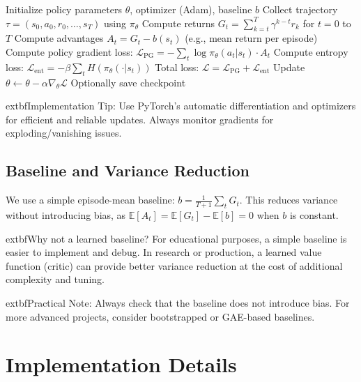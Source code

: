 \documentclass[conference]{IEEEtran}
\begin{document}
\begin{algorithm}[H]
\caption{REINFORCE with Entropy Regularization}
\label{alg:reinforce}
\begin{algorithmic}[1]
\State Initialize policy parameters $\theta$, optimizer (Adam), baseline $b$
    \State Collect trajectory $\tau = (s_0, a_0, r_0, \dots, s_T)$ using $\pi_\theta$
    \State Compute returns $G_t = \sum_{k=t}^T \gamma^{k-t} r_k$ for $t=0$ to $T$
    \State Compute advantages $A_t = G_t - b(s_t)$ (e.g., mean return per episode)
    \State Compute policy gradient loss: $\mathcal{L}_\text{PG} = -\sum_t \log \pi_\theta(a_t|s_t) \cdot A_t$
    \State Compute entropy loss: $\mathcal{L}_\text{ent} = -\beta \sum_t H(\pi_\theta(\cdot|s_t))$
    \State Total loss: $\mathcal{L} = \mathcal{L}_\text{PG} + \mathcal{L}_\text{ent}$
    \State Update $\theta \leftarrow \theta - \alpha \nabla_\theta \mathcal{L}$
    \State Optionally save checkpoint
\EndFor
\end{algorithmic}
\end{algorithm}

	extbf{Implementation Tip:} Use PyTorch's automatic differentiation and optimizers for efficient and reliable updates. Always monitor gradients for exploding/vanishing issues.

\subsection{Baseline and Variance Reduction}


We use a simple episode-mean baseline: $b = \frac{1}{T+1} \sum_t G_t$. This reduces variance without introducing bias, as $\mathbb{E}[A_t] = \mathbb{E}[G_t] - \mathbb{E}[b] = 0$ when $b$ is constant.

	extbf{Why not a learned baseline?} For educational purposes, a simple baseline is easier to implement and debug. In research or production, a learned value function (critic) can provide better variance reduction at the cost of additional complexity and tuning.

	extbf{Practical Note:} Always check that the baseline does not introduce bias. For more advanced projects, consider bootstrapped or GAE-based baselines.


\section{Implementation Details}
\label{sec:implementation}
\end{document}
